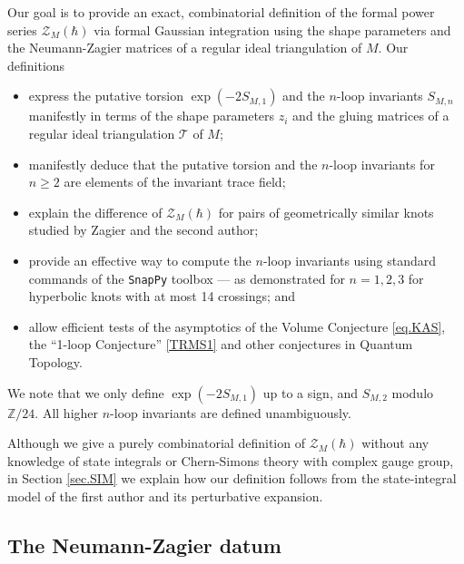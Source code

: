 \documentclass[12pt]{amsart}
\newcommand{\lbl}{\label}
\theoremstyle{definition}
\def\hb{\hbar}
\newcommand{\CZ}{\mathcal{Z}}
\newcommand{\CT}{\mathcal{T}}
\newcommand{\Z}{\mathbb{Z}}
\numberwithin{equation}{section}
\begin{document}
Our goal is to provide an exact, combinatorial definition of the formal
power series $\CZ_M(\hb)$ via formal Gaussian integration using the shape 
parameters and the Neumann-Zagier matrices
of a regular ideal triangulation of $M$. Our definitions

\begin{itemize}
\item
express the putative torsion $\exp(-2S_{M,1})$ and the $n$-loop invariants $S_{M,n}$ manifestly in terms of the shape parameters $z_i$ and the gluing matrices of a regular 
ideal triangulation $\CT$ of $M$;
\item
manifestly deduce that the putative torsion and the $n$-loop invariants 
for $n \geq 2$ are elements of the invariant trace field;
\item
explain the difference of $\CZ_M(\hb)$ for pairs of 
geometrically similar knots studied by Zagier and the second author;
\item
provide an effective way to compute the $n$-loop invariants using 
standard commands of the {\tt SnapPy} toolbox \cite{SnapPy} --- 
as demonstrated for $n=1,2,3$ for hyperbolic knots with at most 14 crossings; 
and
\item
allow efficient tests of the asymptotics of the Volume Conjecture 
\eqref{eq.KAS}, the ``1-loop Conjecture'' \eqref{TRMS1} and
other conjectures in Quantum Topology. 
\end{itemize}

\noindent We note that we only define $\exp(-2S_{M,1})$ up to a sign, and $S_{M,2}$ modulo $\Z/24$. All higher $n$-loop invariants are defined unambiguously.

 Although we give a purely combinatorial definition of $\CZ_M(\hb)$ 
without any knowledge of state integrals or Chern-Simons theory with 
complex gauge group, in Section \ref{sec.SIM} we explain how our definition
follows from the state-integral model of the first author \cite{D1}
and its perturbative expansion.




\subsection{The Neumann-Zagier datum}
\lbl{sec.introNZ}
\end{document}
